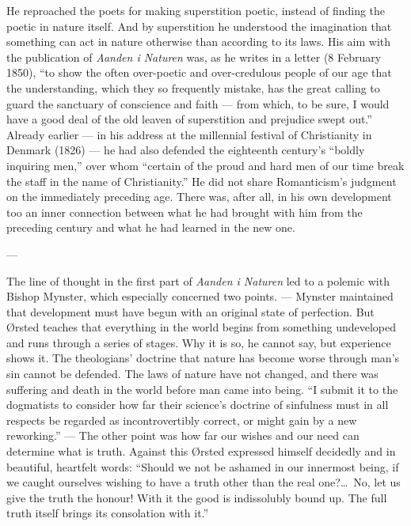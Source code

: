 \documentclass[12pt,a4paper]{book}
\newcommand{\opage}[1]{\marginnote{\footnotesize\textit{[#1]}}}
\begin{document}
He reproached the poets for making superstition poetic, instead of finding the poetic
in nature itself. And by superstition he understood the imagination that something can
act in \opage{55}nature otherwise than according to its laws. His aim with the publication of
\emph{Aanden i Naturen} was, as he writes in a letter (8 February 1850), ``to show the
often over-poetic and over-credulous people of our age that the understanding, which
they so frequently mistake, has the great calling to guard the sanctuary of conscience
and faith --- from which, to be sure, I would have a good deal of the old leaven of
superstition and prejudice swept out.'' Already earlier --- in his address at the
millennial festival of Christianity in Denmark (1826) --- he had also defended the
eighteenth century's ``boldly inquiring men,'' over whom ``certain of the proud and
hard men of our time break the staff in the name of Christianity.'' He did not share
Romanticism's judgment on the immediately preceding age. There was, after all, in his
own development too an inner connection between what he had brought with him from the
preceding century and what he had learned in the new one.

\begin{center}---\end{center}

The line of thought in the first part of \emph{Aanden i Naturen} led to a polemic with
Bishop Mynster, which especially concerned two points. --- Mynster maintained that
development must have begun with an original state of perfection. But Ørsted teaches
that everything in the world begins from something undeveloped and runs through a
series of stages. Why it is so, he cannot say, but experience shows it. The
theologians' doctrine that nature has become worse through man's sin cannot be
defended. The laws of nature have not changed, and there was suffering and death in the
world before man came into being. ``I submit it to the dogmatists to consider how far
their science's doctrine of sinfulness must in all respects be regarded as
incontrovertibly correct, or might gain by a new reworking.'' --- The other point was
how far our wishes and our need can determine what is truth. Against this Ørsted
expressed himself decidedly and in beautiful, heartfelt words: ``Should we not be
ashamed in our innermost being, if we caught ourselves wishing to have a truth other
than the \opage{56}real one?\ldots\ No, let us give the truth the honour! With it the good is
indissolubly bound up. The full truth itself brings its consolation with it.''
\end{document}
